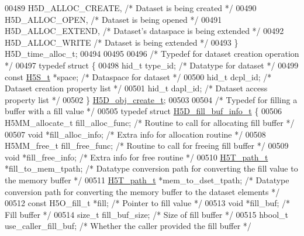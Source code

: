 \begin{DoxyCode}
00489     H5D\_ALLOC\_CREATE,           \textcolor{comment}{/* Dataset is being created */}
00490     H5D\_ALLOC\_OPEN,             \textcolor{comment}{/* Dataset is being opened */}
00491     H5D\_ALLOC\_EXTEND,           \textcolor{comment}{/* Dataset's dataspace is being extended */}
00492     H5D\_ALLOC\_WRITE             \textcolor{comment}{/* Dataset is being extended */}
00493 \} H5D\_time\_alloc\_t;
00494 
00495 
00496 \textcolor{comment}{/* Typedef for dataset creation operation */}
00497 \textcolor{keyword}{typedef} \textcolor{keyword}{struct }\{
00498     hid\_t type\_id;              \textcolor{comment}{/* Datatype for dataset */}
00499     \textcolor{keyword}{const} \hyperlink{struct_h5_s__t}{H5S\_t} *space;         \textcolor{comment}{/* Dataspace for dataset */}
00500     hid\_t dcpl\_id;              \textcolor{comment}{/* Dataset creation property list */}
00501     hid\_t dapl\_id;              \textcolor{comment}{/* Dataset access property list */}
00502 \} \hyperlink{struct_h5_d__obj__create__t}{H5D\_obj\_create\_t};
00503 
00504 \textcolor{comment}{/* Typedef for filling a buffer with a fill value */}
00505 \textcolor{keyword}{typedef} \textcolor{keyword}{struct }\hyperlink{struct_h5_d__fill__buf__info__t}{H5D\_fill\_buf\_info\_t} \{
00506     H5MM\_allocate\_t fill\_alloc\_func;    \textcolor{comment}{/* Routine to call for allocating fill buffer */}
00507     \textcolor{keywordtype}{void}        *fill\_alloc\_info;       \textcolor{comment}{/* Extra info for allocation routine */}
00508     H5MM\_free\_t fill\_free\_func;         \textcolor{comment}{/* Routine to call for freeing fill buffer */}
00509     \textcolor{keywordtype}{void}        *fill\_free\_info;        \textcolor{comment}{/* Extra info for free routine */}
00510     \hyperlink{struct_h5_t__path__t}{H5T\_path\_t} *fill\_to\_mem\_tpath;      \textcolor{comment}{/* Datatype conversion path for converting the fill value
       to the memory buffer */}
00511     \hyperlink{struct_h5_t__path__t}{H5T\_path\_t} *mem\_to\_dset\_tpath;      \textcolor{comment}{/* Datatype conversion path for converting the memory
       buffer to the dataset elements */}
00512     \textcolor{keyword}{const} H5O\_fill\_t *fill;             \textcolor{comment}{/* Pointer to fill value */}
00513     \textcolor{keywordtype}{void}       *fill\_buf;               \textcolor{comment}{/* Fill buffer */}
00514     \textcolor{keywordtype}{size\_t}      fill\_buf\_size;          \textcolor{comment}{/* Size of fill buffer */}
00515     hbool\_t     use\_caller\_fill\_buf;    \textcolor{comment}{/* Whether the caller provided the fill buffer */}

\end{DoxyCode}
